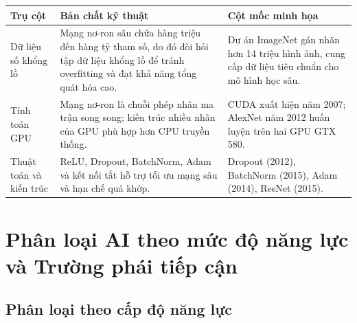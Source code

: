 {\def\LTcaptype{none} %
\begin{longtable}[]{@{}
  >{\raggedright\arraybackslash}p{}
  >{\raggedright\arraybackslash}p{}
  >{\raggedright\arraybackslash}p{}@{}}
\toprule\noalign{}
\begin{minipage}[b]{\linewidth}\raggedright
\textbf{Trụ cột}
\end{minipage} & \begin{minipage}[b]{\linewidth}\centering
\textbf{Bản chất kỹ thuật}
\end{minipage} & \begin{minipage}[b]{\linewidth}\centering
\textbf{Cột mốc minh họa}
\end{minipage} \\
\midrule\noalign{}
\endhead
\bottomrule\noalign{}
\endlastfoot
Dữ liệu số khổng lồ & Mạng nơ-ron sâu chứa hàng triệu đến hàng tỷ tham
số, do đó đòi hỏi tập dữ liệu khổng lồ để tránh overfitting và đạt khả
năng tổng quát hóa cao. & Dự án ImageNet gán nhãn hơn 14 triệu hình ảnh,
cung cấp dữ liệu tiêu chuẩn cho mô hình học sâu. \\
Tính toán GPU & Mạng nơ-ron là chuỗi phép nhân ma trận song song; kiến
trúc nhiều nhân của GPU phù hợp hơn CPU truyền thống. & CUDA xuất hiện
năm 2007; AlexNet năm 2012 huấn luyện trên hai GPU GTX 580. \\
Thuật toán và kiến trúc & ReLU, Dropout, BatchNorm, Adam và kết nối tắt
hỗ trợ tối ưu mạng sâu và hạn chế quá khớp. & Dropout (2012), BatchNorm
(2015), Adam (2014), ResNet (2015). \\
\end{longtable}
}

\section{Phân loại AI theo mức độ năng lực và Trường phái tiếp cận}\label{phuxe2n-loux1ea1i-ai-theo-mux1ee9c-ux111ux1ed9-nux103ng-lux1ef1c-vuxe0-trux1b0ux1eddng-phuxe1i-tiux1ebfp-cux1eadn}

\subsection{Phân loại theo cấp độ năng lực}\label{phuxe2n-loux1ea1i-theo-cux1ea5p-ux111ux1ed9-nux103ng-lux1ef1c}

